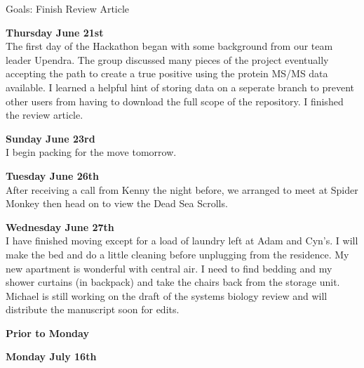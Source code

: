 \documentclass[idxtotoc,hyperref,openany,oneside]{labbook} %
\begin{document}
Goals:
Finish Review Article

\vspace{0.1cm}
\textbf{Thursday June 21st} \\
The first day of the Hackathon began with some background from our team leader Upendra. The group discussed many pieces of the project eventually accepting the path to create a true positive using the protein MS/MS data available. I learned a helpful hint of storing data on a seperate branch to prevent other users from having to download the full scope of the repository. I finished the review article. 

\vspace{0.1cm}
\textbf{Sunday June 23rd} \\
I begin packing for the move tomorrow. 






\textbf{Tuesday June 26th} \\
After receiving a call from Kenny the night before, we arranged to meet at Spider Monkey then head on to view the Dead Sea Scrolls. 

\textbf{Wednesday June 27th} \\
I have finished moving except for a load of laundry left at Adam and Cyn's. I will make the bed and do a little cleaning before unplugging from the residence. My new apartment is wonderful with central air. I need to find bedding and my shower curtains (in backpack) and take the chairs back from the storage unit. 
Michael is still working on the draft of the systems biology review and will distribute the manuscript soon for edits. 


\textbf{Prior to Monday}

\textbf{Monday July 16th}
\end{document}

